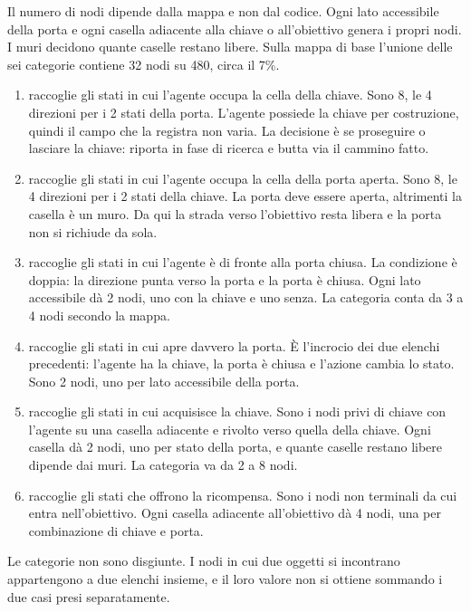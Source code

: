 \documentclass[12pt,a4paper]{article}
\begin{document}
Il numero di nodi dipende dalla mappa e non dal codice. Ogni lato accessibile della porta e ogni casella adiacente alla chiave o all'obiettivo genera i propri nodi. I muri decidono quante caselle restano libere. Sulla mappa di base l'unione delle sei categorie contiene 32 nodi su 480, circa il 7\%.
\begin{enumerate}
\item {} raccoglie gli stati in cui l'agente occupa la cella della chiave. Sono 8, le 4 direzioni per i 2 stati della porta. L'agente possiede la chiave per costruzione, quindi il campo che la registra non varia. La decisione \`e se proseguire o lasciare la chiave:  riporta in fase di ricerca e butta via il cammino fatto.
\item {} raccoglie gli stati in cui l'agente occupa la cella della porta aperta. Sono 8, le 4 direzioni per i 2 stati della chiave. La porta deve essere aperta, altrimenti la casella \`e un muro. Da qui la strada verso l'obiettivo resta libera e la porta non si richiude da sola.
\item {} raccoglie gli stati in cui l'agente \`e di fronte alla porta chiusa. La condizione \`e doppia: la direzione punta verso la porta e la porta \`e chiusa. Ogni lato accessibile d\`a 2 nodi, uno con la chiave e uno senza. La categoria conta da 3 a 4 nodi secondo la mappa.
\item {} raccoglie gli stati in cui  apre davvero la porta. \`E l'incrocio dei due elenchi precedenti: l'agente ha la chiave, la porta \`e chiusa e l'azione cambia lo stato. Sono 2 nodi, uno per lato accessibile della porta.
\item {} raccoglie gli stati in cui  acquisisce la chiave. Sono i nodi privi di chiave con l'agente su una casella adiacente e rivolto verso quella della chiave. Ogni casella d\`a 2 nodi, uno per stato della porta, e quante caselle restano libere dipende dai muri. La categoria va da 2 a 8 nodi.
\item {} raccoglie gli stati che offrono la ricompensa. Sono i nodi non terminali da cui  entra nell'obiettivo. Ogni casella adiacente all'obiettivo d\`a 4 nodi, una per combinazione di chiave e porta.
\end{enumerate}
Le categorie non sono disgiunte. I nodi in cui due oggetti si incontrano appartengono a due elenchi insieme, e il loro valore non si ottiene sommando i due casi presi separatamente.
\end{document}
